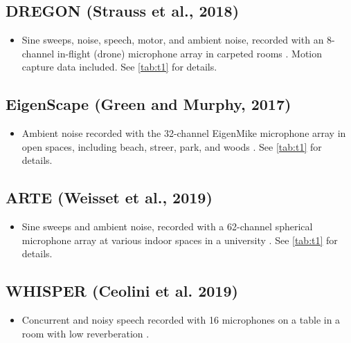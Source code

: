 \documentclass[14pt, legalpaper]{extarticle}
\begin{document}
\subsection{DREGON (Strauss et al., 2018)}

\begin{itemize}

\item Sine sweeps, noise, speech, motor, and ambient noise, recorded with an 8-channel in-flight (drone) microphone array in carpeted rooms \cite{strauss2018dregon}. Motion capture data included. See \ref{tab:t1} for details.

\end{itemize}

\subsection{EigenScape (Green and Murphy, 2017)}

\begin{itemize}

\item Ambient noise recorded with the 32-channel EigenMike microphone array in open spaces, including beach, streer, park, and woods \cite{green2017eigenscape}. See \ref{tab:t1} for details.

\end{itemize}

\subsection{ARTE (Weisset et al., 2019)}

\begin{itemize}

\item Sine sweeps and ambient noise, recorded with a 62-channel spherical microphone array at various indoor spaces in a university \cite{weisser2019ambisonic}. See \ref{tab:t1} for details.

\end{itemize}

\subsection{WHISPER (Ceolini et al. 2019)}

\begin{itemize}

\item Concurrent and noisy speech recorded with 16 microphones on a table in a room with low reverberation \cite{ceolini2020evaluating}.

\end{itemize}
\end{document}
